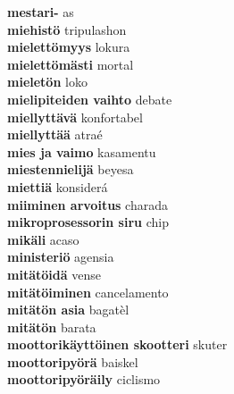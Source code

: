 \textbf{ mestari-  } as \\
\textbf{ miehistö  } tripulashon \\
\textbf{ mielettömyys  } lokura \\
\textbf{ mielettömästi  } mortal \\
\textbf{ mieletön  } loko \\
\textbf{ mielipiteiden vaihto  } debate \\
\textbf{ miellyttävä  } konfortabel \\
\textbf{ miellyttää  } atraé \\
\textbf{ mies ja vaimo  } kasamentu \\
\textbf{ miestennielijä  } beyesa \\
\textbf{ miettiä  } konsiderá \\
\textbf{ miiminen arvoitus  } charada \\
\textbf{ mikroprosessorin siru  } chip \\
\textbf{ mikäli  } acaso \\
\textbf{ ministeriö  } agensia \\
\textbf{ mitätöidä  } vense \\
\textbf{ mitätöiminen  } cancelamento \\
\textbf{ mitätön asia  } bagatèl \\
\textbf{ mitätön  } barata \\
\textbf{ moottorikäyttöinen skootteri  } skuter \\
\textbf{ moottoripyörä  } baiskel \\
\textbf{ moottoripyöräily  } ciclismo \\
